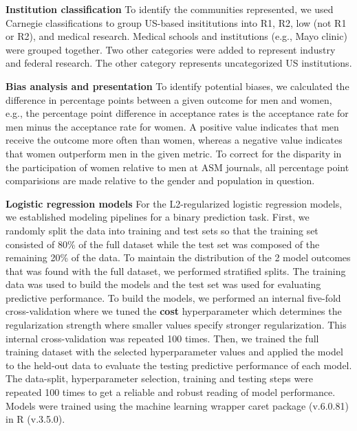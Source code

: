 \documentclass[11pt,]{article}
\begin{document}
\textbf{Institution classification} To identify the communities
represented, we used Carnegie classifications to group US-based
insititutions into R1, R2, low (not R1 or R2), and medical research.
Medical schools and institutions (e.g., Mayo clinic) were grouped
together. Two other categories were added to represent industry and
federal research. The other category represents uncategorized US
institutions.

\textbf{Bias analysis and presentation} To identify potential biases, we
calculated the difference in percentage points between a given outcome
for men and women, e.g., the percentage point difference in acceptance
rates is the acceptance rate for men minus the acceptance rate for
women. A positive value indicates that men receive the outcome more
often than women, whereas a negative value indicates that women
outperform men in the given metric. To correct for the disparity in the
participation of women relative to men at ASM journals, all percentage
point comparisions are made relative to the gender and population in
question.

\textbf{Logistic regression models} For the L2-regularized logistic
regression models, we established modeling pipelines for a binary
prediction task. First, we randomly split the data into training and
test sets so that the training set consisted of 80\% of the full dataset
while the test set was composed of the remaining 20\% of the data. To
maintain the distribution of the 2 model outcomes that was found with
the full dataset, we performed stratified splits. The training data was
used to build the models and the test set was used for evaluating
predictive performance. To build the models, we performed an internal
five-fold cross-validation where we tuned the \textbf{cost}
hyperparameter which determines the regularization strength where
smaller values specify stronger regularization. This internal
cross-validation was repeated 100 times. Then, we trained the full
training dataset with the selected hyperparameter values and applied the
model to the held-out data to evaluate the testing predictive
performance of each model. The data-split, hyperparameter selection,
training and testing steps were repeated 100 times to get a reliable and
robust reading of model performance. Models were trained using the
machine learning wrapper caret package (v.6.0.81) in R (v.3.5.0).
\end{document}
